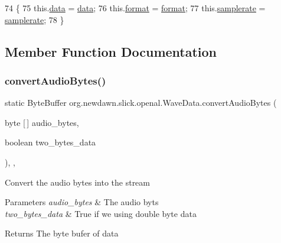 \begin{DoxyCode}
74                                                                   \{
75         this.\mbox{\hyperlink{classorg_1_1newdawn_1_1slick_1_1openal_1_1_wave_data_af9383885dad52bb0a58a05b3d6c3fb9a}{data}} = \mbox{\hyperlink{classorg_1_1newdawn_1_1slick_1_1openal_1_1_wave_data_af9383885dad52bb0a58a05b3d6c3fb9a}{data}};
76         this.\mbox{\hyperlink{classorg_1_1newdawn_1_1slick_1_1openal_1_1_wave_data_a8468309f99692af493c43e31a1591d18}{format}} = \mbox{\hyperlink{classorg_1_1newdawn_1_1slick_1_1openal_1_1_wave_data_a8468309f99692af493c43e31a1591d18}{format}};
77         this.\mbox{\hyperlink{classorg_1_1newdawn_1_1slick_1_1openal_1_1_wave_data_aa8a7b8d65c93fdab24bb923dd0475d6e}{samplerate}} = \mbox{\hyperlink{classorg_1_1newdawn_1_1slick_1_1openal_1_1_wave_data_aa8a7b8d65c93fdab24bb923dd0475d6e}{samplerate}};
78     \}
\end{DoxyCode}


\subsection{Member Function Documentation}
\mbox{\label{classorg_1_1newdawn_1_1slick_1_1openal_1_1_wave_data_aeabccb3f7c90a03c8bde39237f32df34}} 
\subsubsection{\texorpdfstring{convert\+Audio\+Bytes()}{convertAudioBytes()}}
{\footnotesize\ttfamily static Byte\+Buffer org.\+newdawn.\+slick.\+openal.\+Wave\+Data.\+convert\+Audio\+Bytes (\begin{DoxyParamCaption}\item[{byte \mbox{[}$\,$\mbox{]}}]{audio\+\_\+bytes,  }\item[{boolean}]{two\+\_\+bytes\+\_\+data }\end{DoxyParamCaption})\hspace{0.3cm}{\ttfamily [inline]}, {\ttfamily [static]}, {\ttfamily [private]}}

Convert the audio bytes into the stream


\begin{DoxyParams}{Parameters}
{\em audio\+\_\+bytes} & The audio byts \\
\hline
{\em two\+\_\+bytes\+\_\+data} & True if we using double byte data \\
\hline
\end{DoxyParams}
\begin{DoxyReturn}{Returns}
The byte bufer of data 
\end{DoxyReturn}

